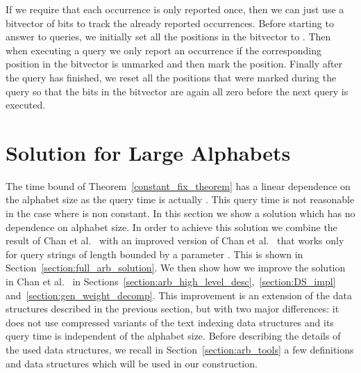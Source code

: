 \documentclass{article}
\newcommand{\?}{\mskip1.5mu}
\begin{document}
If we require that each occurrence is only reported once, then we can just use a bitvector of  bits to track the already reported occurrences. Before starting to answer to queries, we initially set all the positions in the bitvector to . Then when executing a query we only report an occurrence if the corresponding position in the bitvector is unmarked and then mark the position. Finally after the query has finished, we reset all the positions that were marked during the query so that the bits in the bitvector are again all zero before the next query is executed. 



\section{Solution for Large Alphabets}
\label{section:large_alpha}
The time bound of Theorem~\ref{constant_fix_theorem} has a linear dependence on the alphabet size as the query time is actually . This query time is not reasonable in the case where  is non constant. In this section we show a solution which has no dependence on alphabet size. In order to achieve this solution we combine the result of Chan et al.~\cite{chan2011linear} with an improved version of Chan et al.~\cite{CLSTW10} that works only for query strings of length bounded by a parameter . This is shown in Section~\ref{section:full_arb_solution}. We then show how we improve the  solution in Chan et al.~\cite{CLSTW10} in Sections~\ref{section:arb_high_level_desc},~\ref{section:DS_impl} and~\ref{section:gen_weight_decomp}. 
This improvement is an extension of the data structures described in the previous section, but with two major differences: it does not use compressed variants of the text indexing data structures and its query time is independent of the alphabet size. Before describing the details of the used data structures, we recall in Section~\ref{section:arb_tools} a few definitions and data structures which will be used in our construction. 
\end{document}
